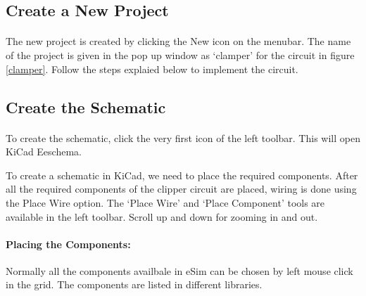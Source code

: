 \subsection*{Create a New Project}

\paragraph{ } The new project is created by clicking the New icon on the
menubar. The name of the project is given in the pop up window as `clamper' for the circuit in figure \ref{clamper}. Follow the steps explaied below to implement the circuit.
\subsection*{Create the Schematic}

\paragraph{}  To create the schematic, click the very first icon of the
left toolbar. This will open KiCad Eeschema.


To create a schematic in KiCad, we need to place the required components. After all the required components of the clipper circuit are placed, wiring is
done using the Place Wire option. The `Place Wire' and `Place Component' tools are available in the left toolbar. Scroll up and down for zooming in and out.




\paragraph{Placing the Components:} Normally all the components availbale in eSim can be chosen by left mouse click in the grid. The components are listed in different libraries. %

